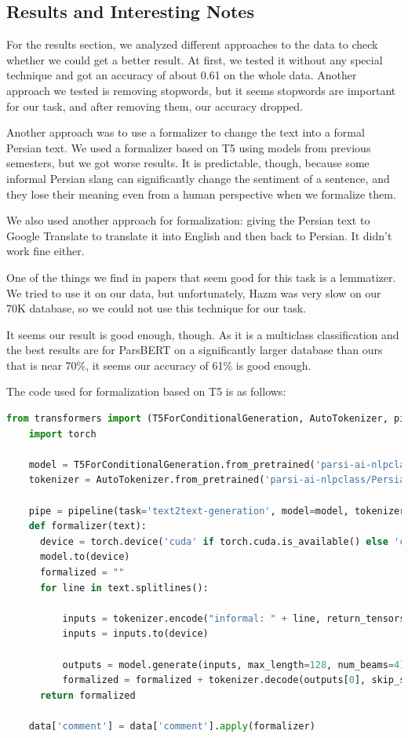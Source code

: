 \documentclass{solutionclass} %
\begin{document}
\subsection{Results and Interesting Notes}

For the results section, we analyzed different approaches to the data to check whether we could get a better result. At first, we tested it without any special technique and got an accuracy of about 0.61 on the whole data. Another approach we tested is removing stopwords, but it seems stopwords are important for our task, and after removing them, our accuracy dropped.


Another approach was to use a formalizer to change the text into a formal Persian text. We used a formalizer based on T5 using models from previous semesters, but we got worse results. It is predictable, though, because some informal Persian slang can significantly change the sentiment of a sentence, and they lose their meaning even from a human perspective when we formalize them.

We also used another approach for formalization: giving the Persian text to Google Translate to translate it into English and then back to Persian. It didn't work fine either.

One of the things we find in papers that seem good for this task is a lemmatizer. We tried to use it on our data, but unfortunately, Hazm was very slow on our 70K database, so we could not use this technique for our task.

It seems our result is good enough, though. As it is a multiclass classification and the best results are for ParsBERT on a significantly larger database than ours that is near 70\%, it seems our accuracy of 61\% is good enough.


The code used for formalization based on T5 is as follows:

\begin{lstlisting}[language=Python]
    from transformers import (T5ForConditionalGeneration, AutoTokenizer, pipeline)
    import torch
    
    model = T5ForConditionalGeneration.from_pretrained('parsi-ai-nlpclass/PersianTextFormalizer')
    tokenizer = AutoTokenizer.from_pretrained('parsi-ai-nlpclass/PersianTextFormalizer')
    
    pipe = pipeline(task='text2text-generation', model=model, tokenizer=tokenizer)
    def formalizer(text):
      device = torch.device('cuda' if torch.cuda.is_available() else 'cpu')  
      model.to(device) 
      formalized = ""
      for line in text.splitlines():
            
          inputs = tokenizer.encode("informal: " + line, return_tensors='pt', max_length=128, truncation=True, padding='max_length')
          inputs = inputs.to(device) 
    
          outputs = model.generate(inputs, max_length=128, num_beams=4)
          formalized = formalized + tokenizer.decode(outputs[0], skip_special_tokens=True) + " "
      return formalized
    
    data['comment'] = data['comment'].apply(formalizer)
\end{lstlisting}
\end{document}
